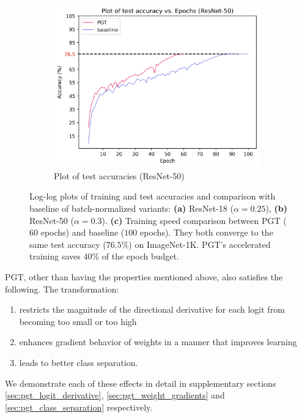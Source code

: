 \documentclass[runningheads]{llncs}
\begin{document}
\begin{figure}[!t]
\begin{subfigure}{.33\textwidth}
\centering
\includegraphics[width=0.98\textwidth]{acc_vs_epoch_r50_60epochs}
\caption{Plot of test accuracies (ResNet-50)}
\end{subfigure}
\caption{ Log-log plots of training and test accuracies and comparison with baseline of
batch-normalized variants: \textbf{(a)} ResNet-18 ($\alpha=0.25$), \textbf{(b)}
ResNet-50 ($\alpha=0.3$). \textbf{(c)} Training speed comparison between PGT ($60$
epochs) and baseline ($100$ epochs). They both converge to the same test accuracy
($76.5\%$) on ImageNet-1K. PGT's accelerated training saves $40\%$ of the epoch budget.
}
\label{fig:metrics}
\vspace{-0.5cm}
\end{figure}



PGT, other than having the properties mentioned above, also satisfies the following. The
transformation:
\begin{enumerate}
\item restricts the magnitude of the directional derivative for each logit from becoming too small or too high
\item enhances gradient behavior of weights in a manner that improves learning
\item leads to better class separation.
\end{enumerate}

We demonstrate each of these effects in detail in supplementary sections
\ref{sec:pgt_logit_derivative}, \ref{sec:pgt_weight_gradients} and
\ref{sec:pgt_class_separation} respectively.
\end{document}
